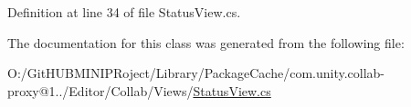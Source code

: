 Definition at line 34 of file Status\+View.\+cs.



The documentation for this class was generated from the following file\+:\begin{DoxyCompactItemize}
\item 
O\+:/\+Git\+H\+U\+B\+M\+I\+N\+I\+P\+Roject/\+Library/\+Package\+Cache/com.\+unity.\+collab-\/proxy@1../\+Editor/\+Collab/\+Views/\mbox{\hyperlink{_status_view_8cs}{Status\+View.\+cs}}\end{DoxyCompactItemize}
